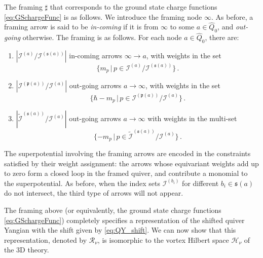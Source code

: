 \documentclass[12pt,a4paper]{article}
\renewcommand{\(}{\left(}
\renewcommand{\)}{\right)}
\renewcommand{\(}{\left(}
\renewcommand{\)}{\right)}
\begin{document}
The framing $\sharp$ that corresponds to the ground state charge functions \eqref{eq:GSchargeFunc} is as follows.
We introduce the framing node $\infty$. 
As before, a framing arrow is said to be \textsl{in-coming} if it is from $\infty$ to some $a\in \widehat{Q}_0$, and \textsl{out-going} otherwise. 
The framing is as follows.
For each node $a\in\widehat{Q}_0$, there are:
\begin{tcolorbox}[breakable]
\begin{enumerate}
\item $|\mathcal{I}^{(a)}/\mathcal{I}^{(\mathfrak{s}(a))}|$ in-coming arrows $\infty\rightarrow a$, with weights in the set
\begin{equation}\label{eq:Incoming}
\{m_p\, |\, p\in \mathcal{I}^{(a)}/\mathcal{I}^{(\mathfrak{s}(a))}\}\,.  
\end{equation}
\item $|\mathcal{I}^{(\mathfrak{p}(a))}/\mathcal{I}^{(a)}|$ out-going arrows $a\rightarrow \infty$, with weights in the set
\begin{equation}\label{eq:Outgoing1}
\{\hbar-m_p\, |\, p\in \mathcal{I}^{(\mathfrak{p}(a))}/\mathcal{I}^{(a)}\}\,.    
\end{equation}
\item $|\tilde{\mathcal{I}}^{(\mathfrak{s}(a))}/\mathcal{I}^{(a)}|$ out-going arrows $a\rightarrow \infty$ with weights in the multi-set
\begin{equation}\label{eq:Outgoing2}
\{-m_p\, |\, p\in \tilde{\mathcal{I}}^{(\mathfrak{s}(a))}/\mathcal{I}^{(a)}\}\,.    
\end{equation}
\end{enumerate}
\end{tcolorbox}
\noindent The superpotential involving the framing arrows are encoded in the constraints satisfied by their weight assignment: the arrows whose equivariant weights add up to zero form a closed loop in the framed quiver, and contribute a monomial to the superpotential.
As before, when the index sets $\mathcal{I}^{(b_i)}$ for different $b_i\in\mathfrak{s}(a)$ do not intersect, the third type of arrows will not appear.  

The framing above (or equivalently, the ground state charge functions \eqref{eq:GSchargeFunc}) completely specifies a representation of the shifted quiver Yangian with the shift given by \eqref{eq:QY_shift}.
We can now show that this representation, denoted by $\mathcal{R}_\nu$, is isomorphic to the vortex Hilbert space $\mathcal{H}_{\nu}$ of the 3D theory.
\end{document}
